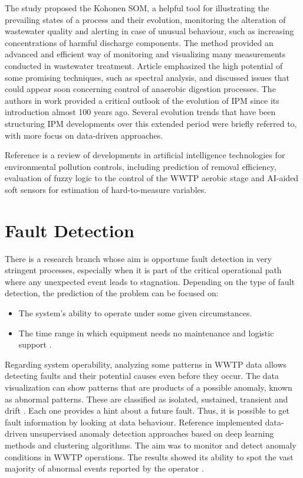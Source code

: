 The study \cite{Liukkonen2013} proposed the Kohonen \ac{SOM}, a helpful tool for illustrating the prevailing states of a process and their evolution, monitoring the alteration of wastewater quality and alerting in case of unusual behaviour, such as increasing concentrations of harmful discharge components. The method provided an advanced and efficient way of monitoring and visualizing many measurements conducted in wastewater treatment. Article \cite{Jimenez2015} emphasized the high potential of some promising techniques, such as spectral analysis, and discussed issues that could appear soon concerning control of anaerobic digestion processes. The authors in work \cite{Reis2017} provided a critical outlook of the evolution of \ac{IPM} since its introduction almost 100 years ago. Several evolution trends that have been structuring \ac{IPM} developments over this extended period were briefly referred to, with more focus on data-driven approaches.

Reference \cite{Ye2020} is a review of developments in artificial intelligence technologies for environmental pollution controls, including prediction of removal efficiency, evaluation of fuzzy logic to the control of the \ac{WWTP} aerobic stage and \ac{AI}-aided soft sensors for estimation of hard-to-measure variables. 

\section{Fault Detection}
\label{s:RelatedWorks-faultDetection}

There is a research branch whose aim is opportune fault detection in very stringent processes, especially when it is part of the critical operational path where any unexpected event leads to stagnation. Depending on the type of fault detection, the prediction of the problem can be focused on:

\begin{itemize}
 \item	The system’s ability to operate under some given circumstances.
 \item	The time range in which equipment needs no maintenance and logistic support \cite{Alsina2018}.
\end{itemize}

Regarding system operability, analyzing some patterns in \ac{WWTP} data allows detecting faults and their potential causes even before they occur. The data visualization can show patterns that are products of a possible anomaly, known as abnormal patterns. These are classified as isolated, sustained, transient and drift \cite{Newhart2019}. Each one provides a hint about a future fault. Thus, it is possible to get fault information by looking at data behaviour. Reference \cite{Dairi2019} implemented data-driven unsupervised anomaly detection approaches based on deep learning methods and clustering algorithms. The aim was to monitor and detect anomaly conditions in \ac{WWTP} operations. The results showed its ability to spot the vast majority of abnormal events reported by the operator \cite{Dairi2019}. 


